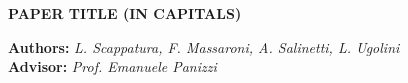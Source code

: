 \documentclass[a4paper,10pt]{article}
\begin{document}
\noindent 
\begin{center}
\textbf{{\Large PAPER TITLE (IN CAPITALS)}} \\
\end{center}

\noindent 
\textbf{Authors: } \textit{L. Scappatura, F. Massaroni, A. Salinetti, L. Ugolini}
\\

\noindent 
\textbf{Advisor: } \textit{Prof. Emanuele Panizzi}
\\

% 



% 
% 
% 
% 
% 
% 






\clearpage
\end{document}
